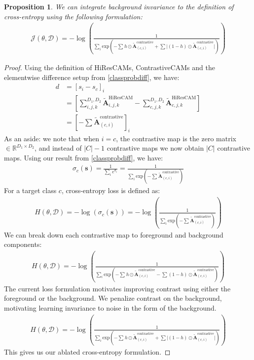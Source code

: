 \documentclass{article}
\newtheorem{theorem}{Proposition}
\begin{document}
\begin{theorem}\label{ablatedce}
	We can integrate background invariance to the definition of cross-entropy using the following formulation:
	\begin{gather}
		\mathcal{J}(\theta, \mathcal{D}) = -\log \left( \frac{1}{\sum_i \text{exp}\left({-\sum^{}h \odot \tilde{\mathcal{\bm{A}}}^{\text{contrastive}}_{(c, i)} + \sum |(1-h) \odot \tilde{\mathcal{\bm{A}}}^{\text{contrastive}}_{(c, i)}}|\right)} \right)
	\end{gather}
\end{theorem}
\begin{proof} Using the definition of HiResCAMs, ContrastiveCAMs and the elementwise difference setup from \ref{classprobdiff}, we have:
	\begin{align}
		d &= [s_i - s_c]_i \\
		&= \left[\sum^{D_1,D_2}_{i,j,k} \tilde{\mathcal{\bm{A}}}_{i,j,k}^{\text{HiResCAM}} - \sum^{D_1,D_2}_{c,j,k} \tilde{\mathcal{\bm{A}}}_{c,j,k}^{\text{HiResCAM}}\right] \\
		&= \left[ -\sum^{}\tilde{\mathcal{\bm{A}}}^{\text{contrastive}}_{(c, i)} \right]_i
	\end{align}
	As an aside: we note that when $i = c$, the contrastive map is the zero matrix $\in \mathbb{R}^{D_1 \times D_2}$, and instead of $|C| - 1$ contrastive maps we now obtain $|C|$ contrastive maps. Using our result from \ref{classprobdiff}, we have:
	\begin{gather}
		\sigma_c(\bm{s}) = \frac{1}{\sum_i e^{d_i}} = \frac{1}{\sum_i \text{exp}({-\sum^{}\tilde{\mathcal{\bm{A}}}^{\text{contrastive}}_{(c, i)}})}
	\end{gather}
	For a target class $c$, cross-entropy loss is defined as:
	\begin{gather}
		H(\theta, \mathcal{D}) = -\log \left( \sigma_c(\bm{s}) \right) = -\log \left( \frac{1}{\sum_i \text{exp}({-\sum^{}\tilde{\mathcal{\bm{A}}}^{\text{contrastive}}_{(c, i)}})} \right)
	\end{gather}
	We can break down each contrastive map to foreground and background components:
	\begin{gather}
		H(\theta, \mathcal{D}) = -\log \left( \frac{1}{\sum_i \text{exp}\left({-\sum^{}h \odot \tilde{\mathcal{\bm{A}}}^{\text{contrastive}}_{(c, i)} - \sum (1-h) \odot \tilde{\mathcal{\bm{A}}}^{\text{contrastive}}_{(c, i)}}\right)} \right)
	\end{gather}
	The current loss formulation motivates improving contrast using either the foreground or the background. We penalize contrast on the background, motivating learning invariance to noise in the form of the background.
	\begin{gather}
		H(\theta, \mathcal{D}) = -\log \left( \frac{1}{\sum_i \text{exp}\left({-\sum^{}h \odot \tilde{\mathcal{\bm{A}}}^{\text{contrastive}}_{(c, i)} + \sum |(1-h) \odot \tilde{\mathcal{\bm{A}}}^{\text{contrastive}}_{(c, i)}}|\right)} \right)
	\end{gather}
	This gives us our ablated cross-entropy formulation.
\end{proof}
\end{document}
